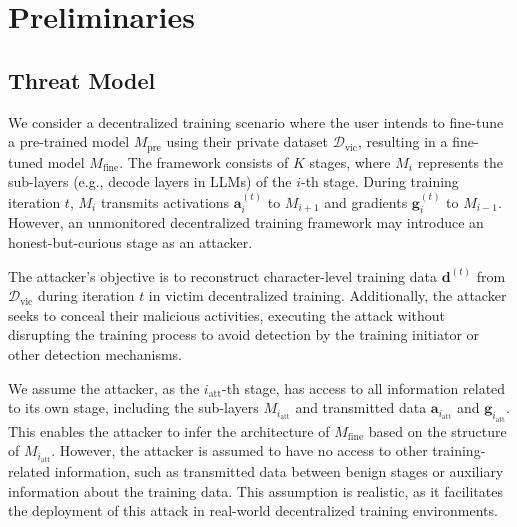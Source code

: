 \section{Preliminaries}

\subsection{Threat Model}
\label{sec:threat_model}

We consider a decentralized training scenario where the user intends to fine-tune a pre-trained model ${M}_\text{pre}$ using their private dataset $\mathcal{D}_\text{vic}$, resulting in a fine-tuned model ${M}_\text{fine}$. The framework consists of $K$ stages, where $M_i$ represents the sub-layers (e.g., decode layers in LLMs) of the $i$-th stage. During training iteration $t$, $M_i$ transmits activations $\bm a_i^{(t)}$ to $M_{i+1}$ and gradients $\bm g_i^{(t)}$ to $M_{i-1}$. However, an unmonitored decentralized training framework may introduce an honest-but-curious stage as an attacker.

The attacker's objective is to reconstruct character-level training data $\bm d^{(t)}$ from $\mathcal{D}_\text{vic}$ during iteration $t$ in victim decentralized training. Additionally, the attacker seeks to conceal their malicious activities, executing the attack without disrupting the training process to avoid detection by the training initiator or other detection mechanisms.

We assume the attacker, as the $i_\text{att}$-th stage, has access to all information related to its own stage, including the sub-layers $M_{i_\text{att}}$ and transmitted data $\bm a_{i_\text{att}}$ and $\bm g_{i_\text{att}}$. This enables the attacker to infer the architecture of ${M}_\text{fine}$ based on the structure of $M_{i_\text{att}}$. However, the attacker is assumed to have no access to other training-related information, such as transmitted data between benign stages or auxiliary information about the training data. This assumption is realistic, as it facilitates the deployment of this attack in real-world decentralized training environments.


